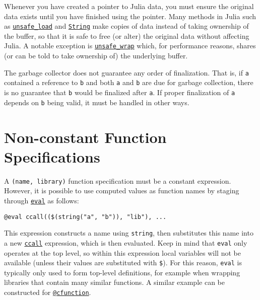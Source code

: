 Whenever you have created a pointer to Julia data, you must ensure the original data exists until you have finished using the pointer. Many methods in Julia such as \hyperlink{13744149973765810952}{\texttt{unsafe\_load}} and \hyperlink{2825695355940841177}{\texttt{String}} make copies of data instead of taking ownership of the buffer, so that it is safe to free (or alter) the original data without affecting Julia. A notable exception is \hyperlink{14566494858943689253}{\texttt{unsafe\_wrap}} which, for performance reasons, shares (or can be told to take ownership of) the underlying buffer.



The garbage collector does not guarantee any order of finalization. That is, if \texttt{a} contained a reference to \texttt{b} and both \texttt{a} and \texttt{b} are due for garbage collection, there is no guarantee that \texttt{b} would be finalized after \texttt{a}. If proper finalization of \texttt{a} depends on \texttt{b} being valid, it must be handled in other ways.



\hypertarget{14397309909238125480}{}


\section{Non-constant Function Specifications}



A \texttt{(name, library)} function specification must be a constant expression. However, it is possible to use computed values as function names by staging through \hyperlink{7507639810592563424}{\texttt{eval}} as follows:




\begin{lstlisting}
@eval ccall(($(string("a", "b")), "lib"), ...
\end{lstlisting}



This expression constructs a name using \texttt{string}, then substitutes this name into a new \hyperlink{14245046751182637566}{\texttt{ccall}} expression, which is then evaluated. Keep in mind that \texttt{eval} only operates at the top level, so within this expression local variables will not be available (unless their values are substituted with \texttt{\$}). For this reason, \texttt{eval} is typically only used to form top-level definitions, for example when wrapping libraries that contain many similar functions. A similar example can be constructed for \hyperlink{11617107520401351255}{\texttt{@cfunction}}.



